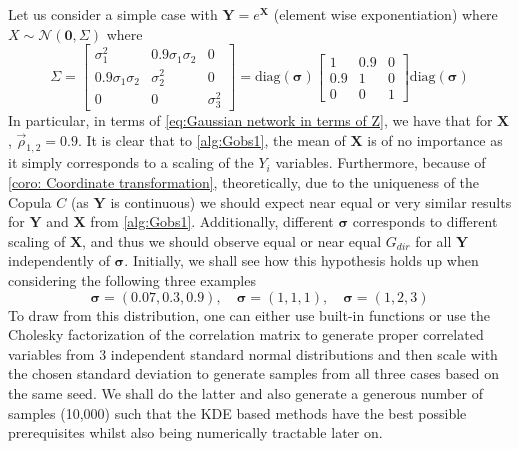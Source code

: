 \documentclass[../Thesis.tex]{subfiles}
\begin{document}
Let us consider a simple case with $\mathbf{Y} = e^{\mathbf{X}}$ (element wise exponentiation) where $X \sim \mathcal{N}\left(\mathbf{0}, \Sigma\right)$ where
$$\Sigma = \begin{bmatrix}
        \sigma_1^2           & 0.9\sigma_1\sigma_2 & 0          \\
        0.9 \sigma_1\sigma_2 & \sigma_2^2          & 0          \\
        0                    & 0                   & \sigma_3^2
    \end{bmatrix} = \text{diag}\left(\boldsymbol \sigma \right) \begin{bmatrix}
        1 & 0.9 & 0\\
        0.9 & 1 & 0\\
        0 & 0 & 1
    \end{bmatrix} \text{diag}\left(\boldsymbol \sigma \right)$$
In particular, in terms of \autoref{eq:Gaussian network in terms of Z}, we have that for $\boldsymbol X$, $\vec{\rho}_{1,2} = 0.9$. It is clear that to \autoref{alg:Gobs1}, the mean of $\boldsymbol X$ is of no importance as it simply corresponds to a scaling of the $Y_i$ variables. Furthermore, because of \autoref{coro: Coordinate transformation}, theoretically, due to the uniqueness of the Copula $C$ (as $\boldsymbol Y$ is continuous) we should expect near equal or very similar results for $\boldsymbol Y$ and $\boldsymbol X$ from \autoref{alg:Gobs1}. Additionally, different $\boldsymbol \sigma$ corresponds to different scaling of $\boldsymbol X$, and thus we should observe equal or near equal $G_{dir}$ for all $\boldsymbol Y$ independently of $\boldsymbol \sigma$. Initially, we shall see how this hypothesis holds up when considering the following three examples
$$
    \boldsymbol\sigma = (0.07, 0.3, 0.9), \quad
    \boldsymbol\sigma = (1,1,1), \quad
    \boldsymbol\sigma = (1,2,3)
$$
To draw from this distribution, one can either use built-in functions or use the Cholesky factorization of the correlation matrix to generate proper correlated variables from $3$ independent standard normal distributions and then scale with the chosen standard deviation to generate samples from all three cases based on the same seed. We shall do the latter and also generate a generous number of samples (10,000) such that the KDE based methods have the best possible prerequisites whilst also being numerically tractable later on.
\end{document}
